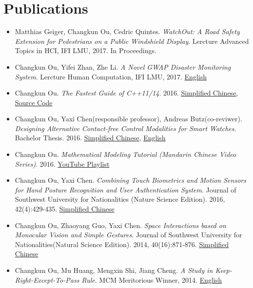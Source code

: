 \documentclass[letterpaper,11pt]{article}
\newcommand{\resumeSubHeadingListStart}{\begin{itemize}[leftmargin=*]}
\newcommand{\resumeSubHeadingListEnd}{\end{itemize}}
\begin{document}
\section{Publications}
 \resumeSubHeadingListStart
   \item{
    Matthias Geiger, Changkun Ou, Cedric Quintes.
     \emph{WatchOut: A Road Safety Extension for Pedestrians on a Public Windshield Display}.
     Lercture Advanced Topics in HCI, IFI LMU, 2017. In Proceedings.
   }
   \item{
     Changkun Ou, Yifei Zhan, Zhe Li.
     \emph{A Novel GWAP Disaster Monitoring System}.
     Lercture Human Computation, IFI LMU, 2017.
     \href{https://github.com/changkun/hc-ss17-disaster-monitoring/blob/master/report/hc_final_project_report_team_Hotpot.pdf}{English}
   }
   \item{
       Changkun Ou.
       \emph{The Fastest Guide of C++11/14}. 
       2016.
       \href{https://www.gitbook.com/book/changkun/cpp1x-tutorial/details}{Simplified Chinese}, 
       \href{https://github.com/changkun/cpp1x-tutorial}{Source Code}
   }
   \item{
       Changkun Ou, Yaxi Chen(responsible professor), Andreas Butz(co-reviwer).
       \emph{Designing Alternative Contact-free Control Modalities for Smart Watches}. 
       Bachelor Thesis. 2016. \href{https://changkun.us/files/cv/bachelor-thesis-cn.html}{Simplified Chinese}, 
       \href{https://changkun.us/files/cv/bachelor-thesis-en.html}{English}
   }
   \item{
       Changkun Ou.
       \emph{Mathematical Modeling Tutorial (Mandarin Chinese Video Series)}.
       2016. \href{https://www.youtube.com/watch?v=EUfXE3vP9_A&list=PLwUqqMt5en7c7iZIseCVAS5BX6RPkS-qR}{YouTube Playlist}
   }
   \item{
       Changkun Ou, Yaxi Chen. 
       \emph{Combining Touch Biometrics and Motion Sensors for Hand Posture Recognition and User Authentication System}. 
       Journal of Southwest University for Nationalities (Nature Science Edition). 
       2016, 42(4):429-435. \href{https://changkun.us/files/cv/touch.swun.html}{Simplified Chinese}
   }
   \item{
       Changkun Ou, Zhaoyang Guo, Yaxi Chen.
       \emph{Space Interactions based on Monocular Vision and Simple Gestures}. 
       Journal of Southwest University for Nationalities(Natural Science Edition). 
       2014, 40(16):871-876. \href{https://changkun.us/files/cv/vision.swun.html}{Simplified Chinese}
   }
   \item{
       Changkun Ou, Mu Huang, Mengxin Shi, Jiang Cheng. 
       \emph{A Study in Keep-Right-Except-To-Pass Rule}. 
       MCM Meritorious Winner, 2014. \href{https://changkun.us/files/cv/28922.public.html}{English}
   }
 \resumeSubHeadingListEnd
\end{document}
